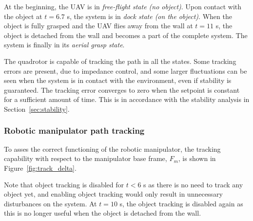 \documentclass[a4paper, 10pt, conference]{ieeeconf}
\begin{document}
At the beginning, the UAV is in \emph{free-flight state (no object)}. Upon
contact with the object at $t=6.7$ s, the system is in \emph{dock state (on the object)}. When the object is fully grasped and the UAV
flies away from the wall at $t=11$ s, the object is detached from the
wall and becomes a part of the complete system. The system is
finally in its \emph{aerial grasp state}. 

The quadrotor is capable of
tracking the path in all the states. Some tracking errors are present,
due to impedance control, and some larger fluctuations can be seen
when the system is in contact with the environment, even if stability
is guaranteed. The tracking error converges to zero when the
setpoint is constant for a sufficient amount of time. This is in
accordance with the stability analysis in Section~\ref{sec:stability}.

\subsubsection{Robotic manipulator path tracking}
To asses the correct functioning of the robotic manipulator,
the tracking capability with respect to the manipulator base frame,
$F_m$, is shown in Figure~\ref{fig:track_delta}.

Note that object tracking is disabled for $t < 6$ s as there is no
need to track any object yet, and enabling object tracking would only
result in unnecessary disturbances on the system. At $t = 10$ s, the
object tracking is disabled again as this is no longer useful when the
object is detached from the wall.
\end{document}
